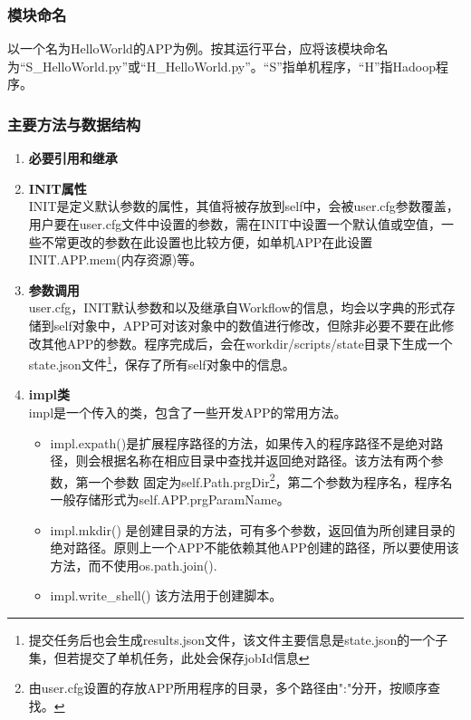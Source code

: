 \documentclass[UTF8,10pt,a4paper]{ctexart}
\begin{document}
 \subsubsection{模块命名}
以一个名为HelloWorld的APP为例。按其运行平台，应将该模块命名为``S\_HelloWorld.py''或``H\_HelloWorld.py''。``S''指单机程序，``H''指Hadoop程序。
\subsubsection{主要方法与数据结构}

\newpage
\begin{enumerate}
\item \textbf{必要引用和继承}\\

\item \textbf{INIT属性}\\
INIT是定义默认参数的属性，其值将被存放到self中，会被user.cfg参数覆盖，用户要在user.cfg文件中设置的参数，需在INIT中设置一个默认值或空值，一些不常更改的参数在此设置也比较方便，如单机APP在此设置INIT.APP.mem(内存资源)等。

\item \textbf{参数调用}\\
user.cfg，INIT默认参数和以及继承自Workflow的信息，均会以字典的形式存储到self对象中，APP可对该对象中的数值进行修改，但除非必要不要在此修改其他APP的参数。程序完成后，会在workdir/scripts/state目录下生成一个state.json文件\footnote{提交任务后也会生成results.json文件，该文件主要信息是state.json的一个子集，但若提交了单机任务，此处会保存jobId信息}，保存了所有self对象中的信息。

\item \textbf{impl类}\\
impl是一个传入的类，包含了一些开发APP的常用方法。
\begin{itemize}
\item impl.expath()是扩展程序路径的方法，如果传入的程序路径不是绝对路径，则会根据名称在相应目录中查找并返回绝对路径。该方法有两个参数，第一个参数 固定为self.Path.prgDir\footnote{由user.cfg设置的存放APP所用程序的目录，多个路径由":"分开，按顺序查找。}，第二个参数为程序名，程序名一般存储形式为self.APP.prgParamName。
\item impl.mkdir() 是创建目录的方法，可有多个参数，返回值为所创建目录的绝对路径。原则上一个APP不能依赖其他APP创建的路径，所以要使用该方法，而不使用os.path.join().
\item impl.write\_shell()  该方法用于创建脚本。
\end{itemize}

\end{enumerate}
\end{document}
